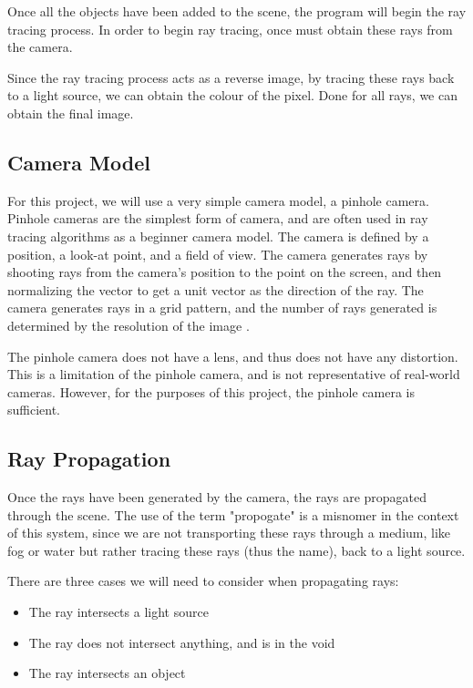 \documentclass[../main.tex]{subfiles}
\begin{document}
Once all the objects have been added to the scene, the program will begin the ray tracing process. In order to begin ray tracing, once must 
obtain these rays from the camera. 

Since the ray tracing process acts as a reverse image, by tracing these rays back to a light source, we can obtain the colour of the pixel. Done for 
all rays, we can obtain the final image.

\subsection{Camera Model}
For this project, we will use a very simple camera model, a pinhole camera. Pinhole cameras are the simplest form of camera, and are often used 
in ray tracing algorithms as a beginner camera model. The camera is defined by a position, a look-at point, and a field of view. 
The camera generates rays by shooting rays from the camera's position to the point on the screen, and then normalizing the vector to get a unit vector 
as the direction of the ray. The camera generates rays in a grid pattern, and the number of rays generated is determined by the resolution of the image \cite{peter_shirley_trevor_david_black_steve_hollasch_ray_nodate}.

The pinhole camera does not have a lens, and thus does not have any distortion. This is a limitation of the pinhole camera, and is not representative of real-world cameras.
However, for the purposes of this project, the pinhole camera is sufficient.

\subsection{Ray Propagation}
Once the rays have been generated by the camera, the rays are propagated through the scene.
The use of the term "propogate" is a misnomer in the context of this system, since we are not transporting these rays through a medium, like fog or water \cite{pharr_physically_2016}
but rather tracing these rays (thus the name), back to a light source.

There are three cases we will need to consider when propagating rays:
\begin{itemize}
  \item The ray intersects a light source
  \item The ray does not intersect anything, and is in the void
  \item The ray intersects an object
\end{itemize}
\end{document}
